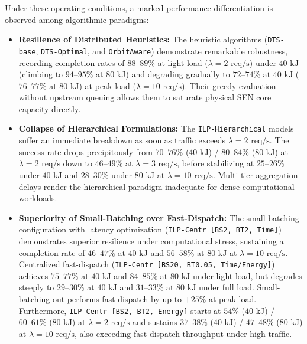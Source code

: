 Under these operating conditions, a marked performance differentiation is observed among algorithmic paradigms:
\begin{itemize}
    \item \textbf{Resilience of Distributed Heuristics:} The heuristic algorithms (\texttt{DTS-base}, \texttt{DTS-Optimal}, and \texttt{OrbitAware}) demonstrate remarkable robustness, recording completion rates of $88\text{--}89\%$ at light load ($\lambda = 2\text{ req/s}$) under $40\text{ kJ}$ (climbing to $94\text{--}95\%$ at $80\text{ kJ}$) and degrading gradually to $72\text{--}74\%$ at $40\text{ kJ}$ ($76\text{--}77\%$ at $80\text{ kJ}$) at peak load ($\lambda = 10\text{ req/s}$). Their greedy evaluation without upstream queuing allows them to saturate physical SEN core capacity directly.
    \item \textbf{Collapse of Hierarchical Formulations:} The \texttt{ILP-Hierarchical} models suffer an immediate breakdown as soon as traffic exceeds $\lambda = 2\text{ req/s}$. The success rate drops precipitously from $70\text{--}76\%$ ($40\text{ kJ}$) / $80\text{--}84\%$ ($80\text{ kJ}$) at $\lambda = 2\text{ req/s}$ down to $46\text{--}49\%$ at $\lambda = 3\text{ req/s}$, before stabilizing at $25\text{--}26\%$ under $40\text{ kJ}$ and $28\text{--}30\%$ under $80\text{ kJ}$ at $\lambda = 10\text{ req/s}$. Multi-tier aggregation delays render the hierarchical paradigm inadequate for dense computational workloads.
    \item \textbf{Superiority of Small-Batching over Fast-Dispatch:} The small-batching configuration with latency optimization (\texttt{ILP-Centr [BS2, BT2, Time]}) demonstrates superior resilience under computational stress, sustaining a completion rate of $46\text{--}47\%$ at $40\text{ kJ}$ and $56\text{--}58\%$ at $80\text{ kJ}$ at $\lambda = 10\text{ req/s}$. Centralized fast-dispatch (\texttt{ILP-Centr [BS20, BT0.05, Time/Energy]}) achieves $75\text{--}77\%$ at $40\text{ kJ}$ and $84\text{--}85\%$ at $80\text{ kJ}$ under light load, but degrades steeply to $29\text{--}30\%$ at $40\text{ kJ}$ and $31\text{--}33\%$ at $80\text{ kJ}$ under full load. Small-batching out-performs fast-dispatch by up to $+25\%$ at peak load. Furthermore, \texttt{ILP-Centr [BS2, BT2, Energy]} starts at $54\%$ ($40\text{ kJ}$) / $60\text{--}61\%$ ($80\text{ kJ}$) at $\lambda = 2\text{ req/s}$ and sustains $37\text{--}38\%$ ($40\text{ kJ}$) / $47\text{--}48\%$ ($80\text{ kJ}$) at $\lambda = 10\text{ req/s}$, also exceeding fast-dispatch throughput under high traffic.
\end{itemize}
\FloatBarrier
